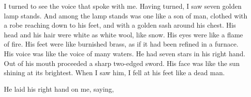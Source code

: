 {\par }{\PP {}I turned to see the voice that spoke with me. Having turned, I saw seven golden lamp stands.
And among the lamp stands was one like a son of man, clothed with a robe reaching down to his feet, and with a golden sash around his chest.
His head and his hair were white as white wool, like snow. His eyes were like a flame of fire.
His feet were like burnished brass, as if it had been refined in a furnace. His voice was like the voice of many waters.
He had seven stars in his right hand. Out of his mouth proceeded a sharp two-edged sword. His face was like the sun shining at its brightest.
When I saw him, I fell at his feet like a dead man.
\par }{\PP He laid his right hand on me, saying,
{}
{}

}
